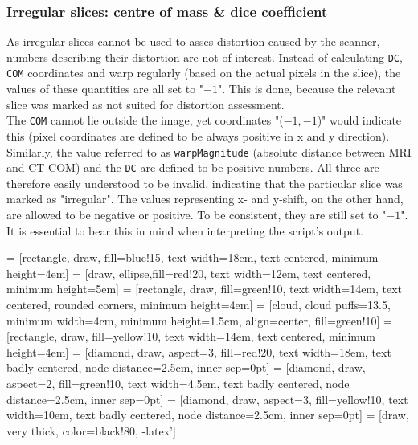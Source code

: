 \subsubsection{Irregular slices: centre of mass \& dice coefficient}
As irregular slices cannot be used to asses distortion caused by the scanner, numbers describing their distortion are not of interest.
Instead of calculating \texttt{DC}, \texttt{COM} coordinates and warp regularly (based on the actual pixels in the slice), the values of these quantities are all set to "$-1$".
This is done, because the relevant slice was marked as not suited for distortion assessment. \\

The \texttt{COM} cannot lie outside the image, yet coordinates "($-1,-1$)" would indicate this (pixel coordinates are defined to be always positive in x and y direction).
Similarly, the value referred to as \texttt{warpMagnitude} (absolute distance between MRI and CT COM) and the \texttt{DC} are defined to be positive numbers.
All three are therefore easily understood to be invalid, indicating that the particular slice was marked as "irregular".
The values representing x- and y-shift, on the other hand, are allowed to be negative or positive.
To be consistent, they are still set to "$-1$".
It is essential to bear this in mind when interpreting the script's output.

 = [rectangle, draw, fill=blue!15, text width=18em, text centered, minimum height=4em]
 = [draw, ellipse,fill=red!20, text width=12em, text centered, minimum height=5em]
 = [rectangle, draw, fill=green!10, text width=14em, text centered, rounded corners, minimum height=4em]
 = [cloud, cloud puffs=13.5, minimum width=4cm, minimum height=1.5cm, align=center, fill=green!10]
 = [rectangle, draw, fill=yellow!10, text width=14em, text centered, minimum height=4em]
 = [diamond, draw, aspect=3, fill=red!20, text width=18em, text badly centered, node distance=2.5cm, inner sep=0pt]
 = [diamond, draw, aspect=2, fill=green!10, text width=4.5em, text badly centered, node distance=2.5cm, inner sep=0pt]
 = [diamond, draw, aspect=3, fill=yellow!10, text width=10em, text badly centered, node distance=2.5cm, inner sep=0pt]
 = [draw, very thick, color=black!80, -latex']

